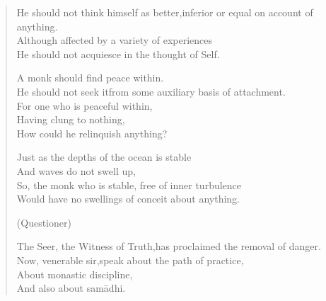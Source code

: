 \begin{verse}

 He should not think himself as better,\newline inferior or equal on account of anything.\\
Although affected by a variety of experiences\\
He should not acquiesce in the thought of Self.


 A monk should find peace within.\\
He should not seek it\newline from some auxiliary basis of attachment.\\
For one who is peaceful within,\\
Having clung to nothing,\\
How could he relinquish anything?


 Just as the depths of the ocean is stable\\
And waves do not swell up,\\
So, the monk who is stable, free of inner turbulence\\
Would have no swellings of conceit about anything.


(Questioner)

 The Seer, the Witness of Truth,\newline has proclaimed the removal of danger.\\
Now, venerable sir,\newline speak about the path of practice,\\
About monastic discipline,\\
And also about sam\=adhi.


\end{verse}

